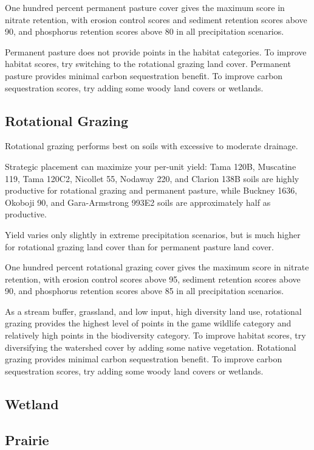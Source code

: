 \documentclass[11pt]{article}
\begin{document}
One hundred percent permanent pasture cover gives the maximum score in nitrate retention, with erosion control scores and sediment retention scores above 90, and phosphorus retention scores above 80 in all precipitation scenarios. 

Permanent pasture does not provide points in the habitat categories. To improve habitat scores, try switching to the rotational grazing land cover. Permanent pasture provides minimal carbon sequestration benefit.  To improve carbon sequestration scores, try adding some woody land covers or wetlands.

\subsection{Rotational Grazing}

Rotational grazing performs best on soils with excessive to moderate drainage.

Strategic placement can maximize your per-unit yield: Tama 120B, Muscatine 119, Tama 120C2, Nicollet 55, Nodaway 220, and Clarion 138B soils are highly productive for rotational grazing and permanent pasture, while Buckney 1636, Okoboji 90, and Gara-Armstrong 993E2 soils are approximately half as productive.

Yield varies only slightly in extreme precipitation scenarios, but is much higher for rotational grazing land cover than for permanent pasture land cover.

One hundred percent rotational grazing cover gives the maximum score in nitrate retention, with erosion control scores above 95, sediment retention scores above 90, and phosphorus retention scores above 85 in all precipitation scenarios.

As a stream buffer, grassland, and low input, high diversity land use, rotational grazing provides the highest level of points in the game wildlife category and relatively high points in the biodiversity category. To improve habitat scores, try diversifying the watershed cover by adding some native vegetation. Rotational grazing provides minimal carbon sequestration benefit.  To improve carbon sequestration scores, try adding some woody land covers or wetlands.

\subsection{Wetland}

\subsection{Prairie}
\end{document}
